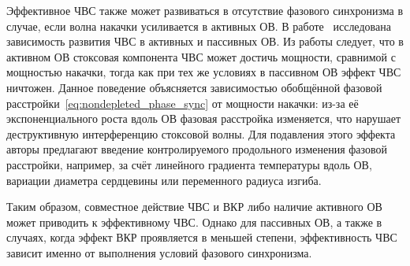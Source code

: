 %

 
 Эффективное ЧВС также может развиваться в отсутствие фазового синхронизма в случае, если волна накачки усиливается в активных ОВ. В работе~\cite{feve2007four} исследована зависимость развития ЧВС в активных и пассивных ОВ.  
 Из работы следует, что в активном ОВ стоксовая компонента ЧВС может достичь мощности, сравнимой с мощностью накачки, тогда как при тех же условиях в пассивном ОВ эффект ЧВС ничтожен. Данное поведение объясняется зависимостью обобщённой фазовой расстройки~\cref{eq:nondepleted_phase_sync} от мощности накачки: из-за её экспоненциального роста вдоль ОВ фазовая расстройка изменяется, что нарушает деструктивную интерференцию стоксовой волны. Для подавления этого эффекта авторы предлагают введение контролируемого продольного изменения фазовой расстройки, например, за счёт линейного градиента температуры вдоль ОВ, вариации диаметра сердцевины или переменного радиуса изгиба. 
 
 Таким образом, совместное действие ЧВС и ВКР либо наличие активного ОВ может приводить к эффективному ЧВС. Однако для пассивных ОВ, а также в случаях, когда эффект ВКР проявляется в меньшей степени, эффективность ЧВС зависит именно от выполнения условий фазового синхронизма. 

